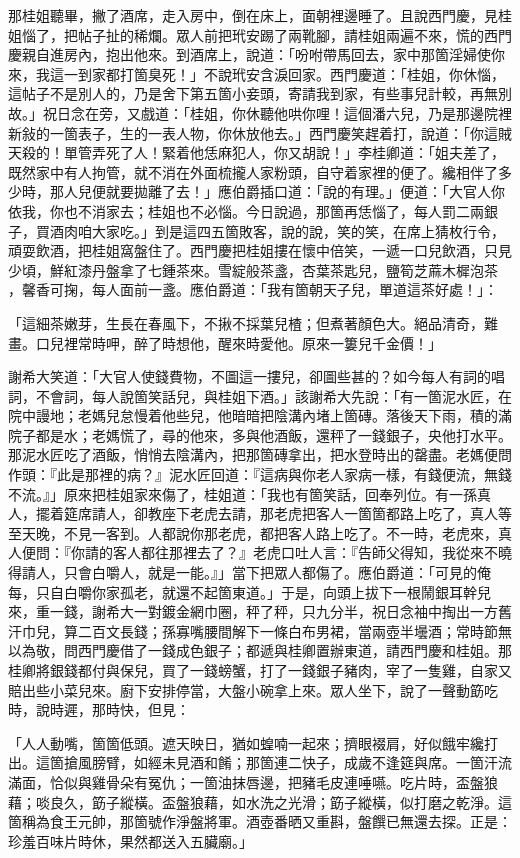 那桂姐聽畢，撇了酒席，走入房中，倒在床上，面朝裡邊睡了。且說西門慶，見桂姐惱了，把帖子扯的稀爛。眾人前把玳安踢了兩靴腳，請桂姐兩遍不來，慌的西門慶親自進房內，抱出他來。到酒席上，說道：「吩咐帶馬回去，家中那箇淫婦使你來，我這一到家都打箇臭死！」不說玳安含淚回家。西門慶道：「桂姐，你休惱，這帖子不是別人的，乃是舍下第五箇小妾頭，寄請我到家，有些事兒計較，再無別故。」祝日念在旁，又戲道：「桂姐，你休聽他哄你哩！這個潘六兒，乃是那邊院裡新敍的一箇表子，生的一表人物，你休放他去。」西門慶笑趕着打，說道：「你這賊天殺的！單管弄死了人！緊着他恁麻犯人，你又胡說！」李桂卿道：「姐夫差了，既然家中有人拘管，就不消在外面梳攏人家粉頭，自守着家裡的便了。纔相伴了多少時，那人兒便就要拋離了去！」應伯爵插口道：「說的有理。」便道：「大官人你依我，你也不消家去；桂姐也不必惱。今日說過，那箇再恁惱了，每人罰二兩銀子，買酒肉咱大家吃。」到是這四五箇敗客，說的說，笑的笑，在席上猜枚行令，頑耍飲酒，把桂姐窩盤住了。西門慶把桂姐摟在懷中倍笑，一遞一口兒飲酒，只見少頃，鮮紅漆丹盤拿了七鍾茶來。雪綻般茶盞，杏葉茶匙兒，鹽筍芝蔴木樨泡茶 ，馨香可掬，每人面前一盞。應伯爵道：「我有箇朝天子兒，單道這茶好處！」：

「這細茶嫩芽，生長在春風下，不揪不採葉兒楂；但煮著顏色大。絕品清奇，難畫。口兒裡常時呷，醉了時想他，醒來時愛他。原來一簍兒千金價！」

謝希大笑道：「大官人使錢費物，不圖這一摟兒，卻圖些甚的？如今每人有詞的唱詞，不會詞，每人說箇笑話兒，與桂姐下酒。」該謝希大先說：「有一箇泥水匠，在院中謾地；老媽兒怠慢着他些兒，他暗暗把陰溝內堵上箇磚。落後天下雨，積的滿院子都是水；老媽慌了，尋的他來，多與他酒飯，還秤了一錢銀子，央他打水平。那泥水匠吃了酒飯，悄悄去陰溝內，把那箇磚拿出，把水登時出的罄盡。老媽便問作頭：『此是那裡的病？』泥水匠回道：『這病與你老人家病一樣，有錢便流，無錢不流。』」原來把桂姐家來傷了，桂姐道：「我也有箇笑話，回奉列位。有一孫真人，擺着筵席請人，卻教座下老虎去請，那老虎把客人一箇箇都路上吃了，真人等至天晚，不見一客到。人都說你那老虎，都把客人路上吃了。不一時，老虎來，真人便問：『你請的客人都往那裡去了？』老虎口吐人言：『告師父得知，我從來不曉得請人，只會白嚼人，就是一能。』」當下把眾人都傷了。應伯爵道：「可見的俺每，只自白嚼你家孤老，就還不起箇東道。」于是，向頭上拔下一根鬧銀耳幹兒來，重一錢，謝希大一對鍍金網巾圈，秤了秤，只九分半，祝日念袖中掏出一方舊汗巾兒，算二百文長錢；孫寡嘴腰間解下一條白布男裙，當兩壺半壜酒；常時節無以為敬，問西門慶借了一錢成色銀子；都遞與桂卿置辦東道，請西門慶和桂姐。那桂卿將銀錢都付與保兒，買了一錢螃蟹，打了一錢銀子豬肉，宰了一隻雞，自家又賠出些小菜兒來。廚下安排停當，大盤小碗拿上來。眾人坐下，說了一聲動筯吃時，說時遲，那時快，但見：

「人人動嘴，箇箇低頭。遮天映日，猶如蝗喃一起來；擠眼裰肩，好似餓牢纔打出。這箇搶風膀臂，如經未見酒和餚；那箇連二快子，成歲不逢筵與席。一箇汗流滿面，恰似與雞骨朵有冤仇；一箇油抹唇邊，把豬毛皮連唾嚥。吃片時，盃盤狼藉；啖良久，筯子縱橫。盃盤狼藉，如水洗之光滑；筯子縱橫，似打磨之乾淨。這箇稱為食王元帥，那箇號作淨盤將軍。酒壺番晒又重斟，盤饌已無還去探。正是：珍羞百味片時休，果然都送入五臟廟。」


